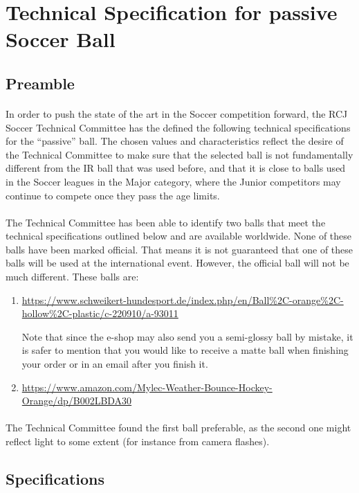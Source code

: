 \documentclass{article}
\newcommand*{\p}{\paragraph{}}
\begin{document}
\section{Technical Specification for passive Soccer Ball\label{ref-passive-spec}}

\subsection{Preamble}

\p In order to push the state of the art in the Soccer competition forward, the
RCJ Soccer Technical Committee has the defined the following technical
specifications for the ``passive'' ball. The chosen values and characteristics
reflect the desire of the Technical Committee to make sure that the selected
ball is not fundamentally different from the IR ball that was used before, and
that it is close to balls used in the Soccer leagues in the Major category,
where the Junior competitors may continue to compete once they pass the age
limits.

\p The Technical Committee has been able to identify two balls that meet the
technical specifications outlined below and are available worldwide. None of
these balls have been marked official. That means it is not guaranteed that one
of these balls will be used at the international event. However, the official
ball will not be much different. These balls are:

\begin{enumerate}

\item \url{https://www.schweikert-hundesport.de/index.php/en/Ball%2C-orange%2C-hollow%2C-plastic/c-220910/a-93011}

    Note that since the e-shop may also send you a semi-glossy ball
        by mistake, it is safer to mention that you would like to receive a
        matte ball when finishing your order or in an email after you finish it.

\item \url{https://www.amazon.com/Mylec-Weather-Bounce-Hockey-Orange/dp/B002LBDA30}

\end{enumerate}

\p The Technical Committee found the first ball preferable, as the second one
might reflect light to some extent (for instance from camera flashes).

\subsection{Specifications}
\end{document}
